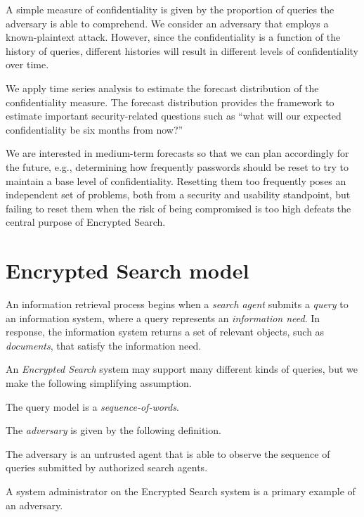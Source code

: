 \documentclass[final,
  11pt,
]{article}
\begin{document}
A simple measure of confidentiality is given by the proportion of
queries the adversary is able to comprehend. We consider an adversary
that employs a known-plaintext attack. However, since the
confidentiality is a function of the history of queries, different
histories will result in different levels of confidentiality over time.

We apply time series analysis to estimate the forecast distribution of
the confidentiality measure. The forecast distribution provides the
framework to estimate important security-related questions such as
``what will our expected confidentiality be six months from now?''

We are interested in medium-term forecasts so that we can
plan accordingly for the future, e.g., determining how frequently
passwords should be reset to try to maintain a base level of
confidentiality. Resetting them too frequently poses an independent set
of problems, both from a security and usability standpoint, but failing
to reset them when the risk of being compromised is too high defeats the
central purpose of Encrypted Search.

\hypertarget{encrypted-search-model}{%
\section{Encrypted Search model}\label{encrypted-search-model}}

\label{sec:es_model} An information retrieval process begins when a
\emph{search agent} submits a \emph{query} to an information system,
where a query represents an \emph{information need}. In response, the
information system returns a set of relevant objects, such as
\emph{documents}, that satisfy the information need.

An \emph{Encrypted Search} system may support many different kinds of
queries, but we make the following simplifying assumption.

\begin{assumption}
The query model is a \emph{sequence-of-words}.
\end{assumption}

The \emph{adversary} is given by the following definition.
\begin{definition}
The adversary is an untrusted agent that is able to observe the sequence of
queries submitted by authorized search agents.
\end{definition}
A system administrator on the Encrypted Search system is a primary example of
an adversary.
\end{document}
